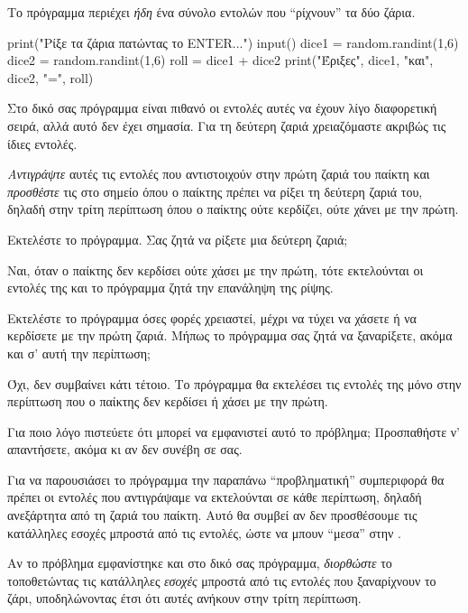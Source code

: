 \documentclass[a4paper,11pt,oneside]{book}
\begin{document}
\begin{step}
Το πρόγραμμα περιέχει \emph{ήδη} ένα σύνολο εντολών που ``ρίχνουν'' τα δύο ζάρια. 

\begin{pyplain}
print("Ρίξε τα ζάρια πατώντας το ENTER...")
input()
dice1 = random.randint(1,6)
dice2 = random.randint(1,6)
roll = dice1 + dice2
print("Έριξες", dice1, "και", dice2, "=", roll)
\end{pyplain}

Στο δικό σας πρόγραμμα είναι πιθανό οι εντολές αυτές να έχουν λίγο διαφορετική σειρά, αλλά αυτό δεν έχει σημασία. Για τη δεύτερη ζαριά χρειαζόμαστε ακριβώς τις ίδιες εντολές.

\emph{Αντιγράψτε} αυτές τις εντολές που αντιστοιχούν στην πρώτη ζαριά του παίκτη και \emph{προσθέστε} τις στο σημείο όπου ο παίκτης πρέπει να ρίξει τη δεύτερη ζαριά του, δηλαδή στην τρίτη περίπτωση όπου ο παίκτης ούτε κερδίζει, ούτε χάνει με την πρώτη.

Εκτελέστε το πρόγραμμα. Σας ζητά να ρίξετε μια δεύτερη ζαριά;

\begin{answer}
Ναι, όταν ο παίκτης δεν κερδίσει ούτε χάσει με την πρώτη, τότε εκτελούνται οι εντολές της  και το πρόγραμμα ζητά την επανάληψη της ρίψης.
\end{answer}

Εκτελέστε το πρόγραμμα όσες φορές χρειαστεί, μέχρι να τύχει να χάσετε ή να κερδίσετε με την πρώτη ζαριά. Μήπως το πρόγραμμα σας ζητά να ξαναρίξετε, ακόμα και σ' αυτή την περίπτωση;

\begin{answer}
Όχι, δεν συμβαίνει κάτι τέτοιο. Το πρόγραμμα θα εκτελέσει τις εντολές της  μόνο στην περίπτωση που ο παίκτης δεν κερδίσει ή χάσει με την πρώτη.
\end{answer}

Για ποιο λόγο πιστεύετε ότι μπορεί να εμφανιστεί αυτό το πρόβλημα; Προσπαθήστε ν' απαντήσετε, ακόμα κι αν δεν συνέβη σε σας.

\begin{answer}
Για να παρουσιάσει το πρόγραμμα την παραπάνω ``προβληματική'' συμπεριφορά θα πρέπει οι εντολές που αντιγράψαμε να εκτελούνται σε κάθε περίπτωση, δηλαδή ανεξάρτητα από τη ζαριά του παίκτη. Αυτό θα συμβεί αν δεν προσθέσουμε τις κατάλληλες εσοχές μπροστά από τις εντολές, ώστε να μπουν ``μεσα'' στην .
\end{answer}

\marginnote[18pt]{\iconcaution}
Αν το πρόβλημα εμφανίστηκε και στο δικό σας πρόγραμμα, \emph{διορθώστε} το τοποθετώντας τις κατάλληλες \emph{εσοχές} μπροστά από τις εντολές που ξαναρίχνουν το ζάρι, υποδηλώνοντας έτσι ότι αυτές ανήκουν στην τρίτη περίπτωση.
\end{step}
\end{document}
